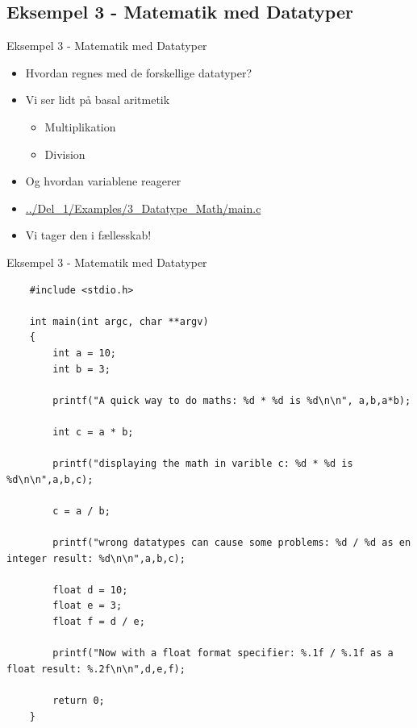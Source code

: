 \documentclass{beamer}
\begin{document}
\subsection{Eksempel 3 - Matematik med Datatyper}
\begin{frame}{Eksempel 3 - Matematik med Datatyper}
	\begin{itemize}
	\item{Hvordan regnes med de forskellige datatyper?}
	\item{Vi ser lidt på basal aritmetik}
		\begin{itemize}
		\item{Multiplikation}
		\item{Division}
		\end{itemize}
	\item{Og hvordan variablene reagerer}
	\item{\color{link}\href{https://github.com/Iakop/C-Programmering-for-begyndere/tree/master/Del_1/Examples/3_Datatype_Math/main.c}{../Del\_1/Examples/3\_Datatype\_Math/main.c}}
	\item{Vi tager den i fællesskab!}
	\end{itemize}
\end{frame}

\begin{frame}[fragile]{Eksempel 3 - Matematik med Datatyper}
	\lstset{basicstyle=\tiny}
	\begin{lstlisting}
	#include <stdio.h>

	int main(int argc, char **argv)
	{
  		int a = 10;
  		int b = 3;
  
  		printf("A quick way to do maths: %d * %d is %d\n\n", a,b,a*b);
  		
  		int c = a * b;

  		printf("displaying the math in varible c: %d * %d is %d\n\n",a,b,c);
  
  		c = a / b;
  
  		printf("wrong datatypes can cause some problems: %d / %d as en integer result: %d\n\n",a,b,c);
  
  		float d = 10;
  		float e = 3;
  		float f = d / e;
  
  		printf("Now with a float format specifier: %.1f / %.1f as a float result: %.2f\n\n",d,e,f);
  
		return 0;
	}
	\end{lstlisting}
\end{frame}
\end{document}
